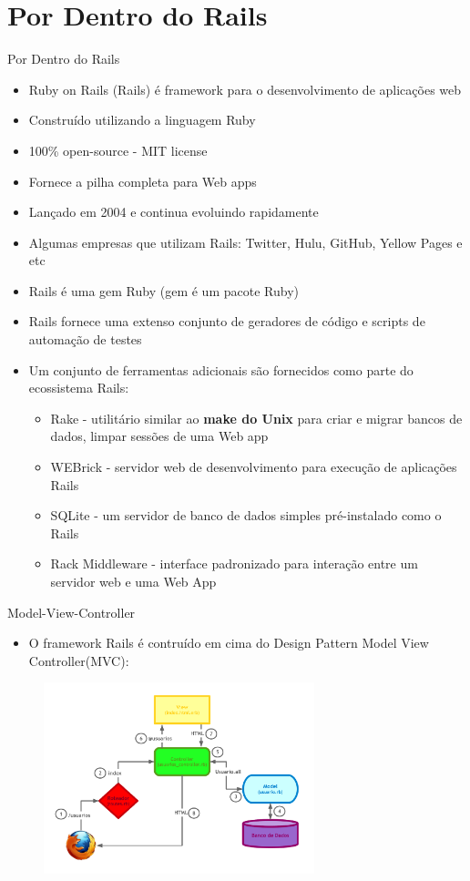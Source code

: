 \section{Por Dentro do Rails}

\begin{frame}{Por Dentro do Rails}
	\begin{itemize}
		\item Ruby on Rails (Rails) é framework para o desenvolvimento de aplicações web
		\item Construído utilizando a linguagem Ruby
		\item 100\% open-source - MIT license
		\item Fornece a pilha completa para Web apps
		\item Lançado em 2004 e continua evoluindo rapidamente
		\item Algumas empresas que utilizam Rails: Twitter, Hulu, GitHub, Yellow Pages e etc
	\end{itemize}
\framebreak
	\begin{itemize}
		\item Rails é uma \alert{gem} Ruby (gem é um pacote Ruby)
		\item Rails fornece uma extenso conjunto de geradores de código e scripts de automação de testes
		\item Um conjunto de ferramentas adicionais são fornecidos como parte do ecossistema Rails:
		\begin{itemize}
			\item \alert{Rake} - utilitário similar ao \textbf{make do Unix} para criar e migrar bancos de dados, limpar sessões de uma Web app
			\item \alert{WEBrick} - servidor web de desenvolvimento para execução de aplicações Rails
			\item \alert{SQLite} - um servidor de banco de dados simples pré-instalado como o Rails
			\item \alert{Rack Middleware} - interface padronizado para interação entre um servidor web e uma Web App
		\end{itemize}
	\end{itemize}
\end{frame}

\begin{frame}[t, fragile]{Model-View-Controller}
	\begin{itemize}
		\item O framework Rails é contruído em cima do Design Pattern Model View Controller(MVC):
	\end{itemize}
	\begin{figure}[h!]
		\centering
		\includegraphics[width=0.70\textwidth]{imagens/mvc-1.pdf}
	\end{figure}
\end{frame}